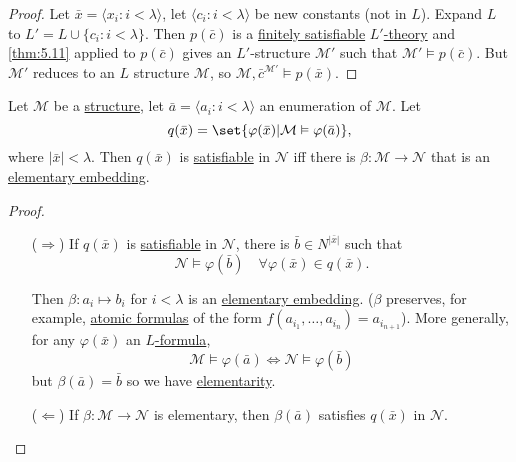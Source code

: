 \documentclass{article}
\let\models\vDash
\begin{document}
\begin{proof}
  Let $\bar{x} = \langle x_i : i < \lambda \rangle$, let $\langle c_i : i < \lambda \rangle$ be new constants (not in $L$).
  Expand $L$ to $L' = L \cup \{c_i : i < \lambda\}$.
  Then $p(\bar{c})$ is a \hyperlink{def:fs}{finitely satisfiable} \hyperlink{def:ltheory}{$L'$-theory} and \cref{thm:5.11} applied to $p(\bar{c})$ gives an $L'$-structure $\mathcal{M}'$ such that $\mathcal{M}' \models p(\bar{c})$.
  But $\mathcal{M}'$ reduces to an $L$ structure $\mathcal{M}$, so $\mathcal{M}, \bar{c}^{\mathcal{M}'} \models p(\bar{x})$.
\end{proof}
\begin{nlemma}\label{lem:5.14}
  Let $\mathcal{M}$ be a \hyperlink{def:str}{structure}, let $\bar{a} = \langle a_i : i < \lambda \rangle$ an enumeration of $\mathcal{M}$.
  Let
  \begin{equation*}q(\bar{x}) = \set{\varphi(\bar{x}) | \mathcal{M} \models \varphi(\bar{a})},\end{equation*}
  where $|\bar{x}| < \lambda$.
  Then $q(\bar{x})$ is \hyperlink{def:type}{satisfiable} in $\mathcal{N}$ iff there is $\beta: \mathcal{M} \to \mathcal{N}$ that is an \hyperlink{def:el}{elementary embedding}.
\end{nlemma}
\begin{proof}\leavevmode
  \begin{itemize}
    \item[($\Rightarrow$)] If $q(\bar{x})$ is \hyperlink{def:type}{satisfiable} in $\mathcal{N}$, there is $\bar{b} \in N^{|\bar{x}|}$ such that
  \begin{equation*}
    \mathcal{N} \models \varphi(\bar{b}) \quad \forall \varphi(\bar{x}) \in q(\bar{x}).
  \end{equation*}

  Then $\beta: a_i \mapsto b_i$ for $i < \lambda$ is an \hyperlink{def:el}{elementary embedding}.
  ($\beta$ preserves, for example, \hyperlink{def:atomform}{atomic formulas} of the form $f(a_{i_1}, \dotsc, a_{i_n}) = a_{i_{n+1}}$).
  More generally, for any $\varphi(\bar{x})$ an \hyperlink{def:form}{$L$-formula},
  \begin{equation*}
    \mathcal{M} \models \varphi(\bar{a}) \iff \mathcal{N} \models \varphi(\bar{b})
  \end{equation*}
  but $\beta(\bar{a}) = \bar{b}$ so we have \hyperlink{def:el}{elementarity}.

  \item[($\Leftarrow$)] If $\beta: \mathcal{M} \to \mathcal{N}$ is elementary, then $\beta(\bar{a})$ satisfies $q(\bar{x})$ in $\mathcal{N}$. \qedhere
  \end{itemize}
\end{proof}
\end{document}
